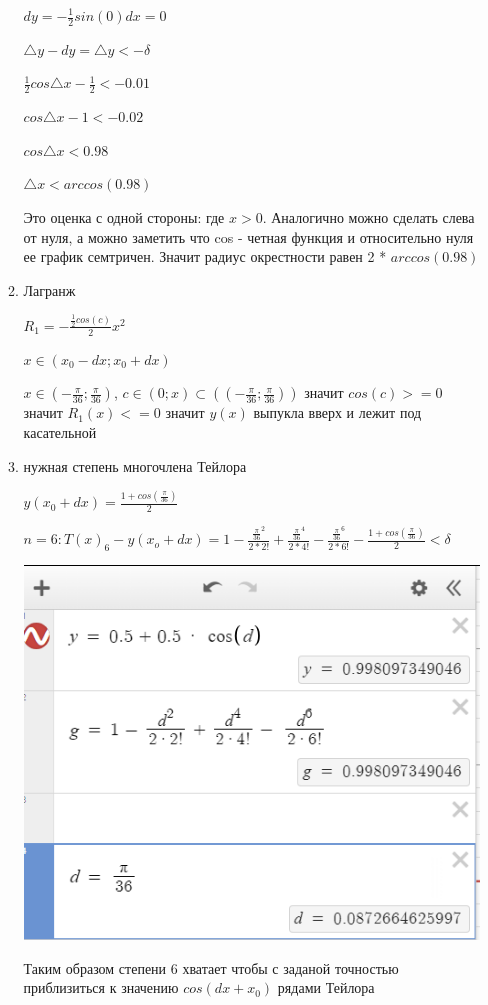\begin{enumerate}
\begin{enumerate}
    $\displaystyle  dy = -\frac{1}{2}sin(0) dx = 0$

    $\displaystyle  \triangle y - dy = \triangle y < - \delta$

    $\displaystyle \frac{1}{2} cos \triangle x - \frac{1}{2} < -0.01$

    $\displaystyle cos \triangle x - 1 < -0.02$

    $\displaystyle cos \triangle x < 0.98$

    $\displaystyle \triangle x < arccos (0.98)$

    Это оценка с одной стороны: где $x > 0$. Аналогично можно сделать слева от нуля, а можно заметить что cos - четная функция и относительно нуля ее график семтричен. Значит радиус окрестности равен 2 * $arccos(0.98)$
    
    \item Лагранж

    $\displaystyle R_1 = -\frac{\frac{1}{2}cos (c)}{2}x^2$

    $\displaystyle x \in (x_0 -dx; x_0 + dx)$

    $\displaystyle x \in (-\frac{\pi}{36}; \frac{\pi}{36})$, $c \in (0; x) \subset ((-\frac{\pi}{36}; \frac{\pi}{36}))$ значит $cos(c) >= 0$ значит $R_1(x) <= 0$ значит $y(x)$ выпукла вверх и лежит под касательной

    \item нужная степень многочлена Тейлора

    $\displaystyle y(x_0 + dx) = \frac{1 + cos (\frac{\pi}{36})}{2}$

    $\displaystyle n = 6: T(x)_6 - y(x_o + dx) = 1 - \frac{{\frac{\pi}{36}}^2}{2 * 2!} + \frac{{\frac{\pi}{36}}^4}{2 * 4!} - \frac{{\frac{\pi}{36}}^6}{2 * 6!} - \frac{1 + cos (\frac{\pi}{36})}{2} < \delta$

    \includegraphics[width=0.55\linewidth]{images/2_check.png}

    Таким образом степени 6 хватает чтобы с заданой точностью приблизиться к значению $cos(dx + x_0)$ рядами Тейлора 
    

\end{enumerate}
\end{enumerate}
